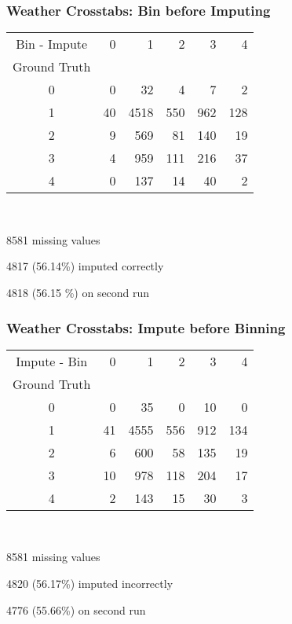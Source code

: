 \begin{frame}[t]
	\frametitle{Weather Crosstabs:  Bin before Imputing}
	\Large

\begin{tabular}{crrrrr}
Bin - Impute &   0 &     1 &    2 &     3 &    4 \\
Ground Truth &     &       &      &       &      \\
\hline
0              &   0 &    32 &    4 &    7 &    2 \\
1              &  40 &  4518 &  550 &  962 &  128 \\
2              &   9 &   569 &   81 &  140 &   19 \\
3              &   4 &   959 &  111 &  216 &   37 \\
4              &   0 &   137 &   14 &   40 &    2 \\
\end{tabular}

\

8581 missing values

4817 (56.14\%) imputed correctly

4818 (56.15 \%) on second run

\end{frame}


\begin{frame}[t]
	\frametitle{Weather Crosstabs:  Impute before Binning}
	\Large

\begin{tabular}{crrrrr}
Impute - Bin &   0 &     1 &    2 &     3 &    4 \\
Ground Truth &     &       &      &       &      \\
\hline
0              &   0 &    35 &    0 &   10 &    0 \\
1              &  41 &  4555 &  556 &  912 &  134 \\
2              &   6 &   600 &   58 &  135 &   19 \\
3              &  10 &   978 &  118 &  204 &   17 \\
4              &   2 &   143 &   15 &   30 &    3 \\
\end{tabular}

\

8581 missing values

4820 (56.17\%) imputed incorrectly

4776 (55.66\%) on second run

\end{frame}

